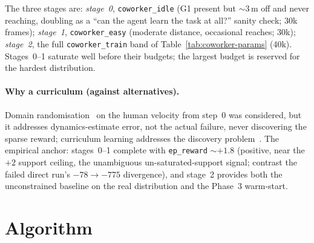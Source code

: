 \documentclass[11pt,a4paper]{report}
\begin{document}
\label{tab:curriculum-stages}%
The three stages are: \emph{stage~0}, \texttt{coworker\_idle} (G1
present but $\sim$3\,m off and never reaching, doubling as a
``can the agent learn the task at all?'' sanity check; 30k frames);
\emph{stage~1}, \texttt{coworker\_easy} (moderate distance,
occasional reaches; 30k); \emph{stage~2}, the full
\texttt{coworker\_train} band of Table~\ref{tab:coworker-params}
(40k). Stages~0--1 saturate well before their budgets; the largest
budget is reserved for the hardest distribution.

\paragraph{Why a curriculum (against alternatives).}
Domain randomisation~\cite{tobin2017domainrand} on the human
velocity from step~0 was considered, but it addresses
dynamics-estimate error, not the actual failure, never discovering
the sparse reward; curriculum learning addresses the discovery
problem~\cite{narvekar2020curriculum,openai2019solving}. The
empirical anchor: stages~0--1 complete with \texttt{ep\_reward}
$\sim{+}1.8$ (positive, near the $+2$ support ceiling, the
unambiguous un-saturated-support signal; contrast the failed direct
run's $-78 \to -775$ divergence), and stage~2 provides both the
unconstrained baseline on the real distribution and the Phase~3
warm-start.


\section{Algorithm}
\label{sec:method:algorithm}
\end{document}
